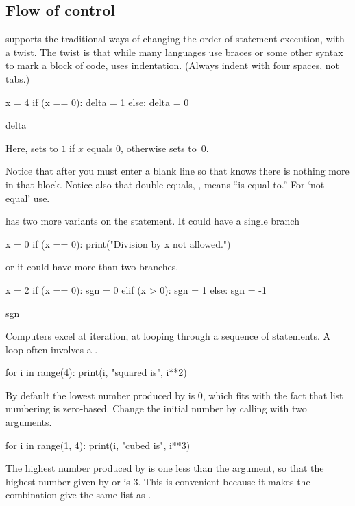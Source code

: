 \subsection{Flow of control}
\python{} supports the traditional ways of changing the order of 
statement execution, with a twist.
The twist is that while many languages use braces or some other syntax to
mark a block of code, \python{} uses indentation.
(Always indent with four spaces, not tabs.)
\begin{pythonconsole}
x = 4
if (x == 0):
    delta = 1
else:
    delta = 0

delta
\end{pythonconsole}
Here, \python{} sets  to  $1$ if $x$
equals $0$, otherwise \python{} sets  to~$0$. 

Notice that after  you must enter 
a blank line so that \python{} knows there is nothing more in that block.
Notice also that double equals, \inlinecode{==}, means ``is equal to.'' 
For `not equal' use\inlinecode{!=}. 

\python{} has two more variants on the  statement.
It could have a single branch
\begin{pythonconsole}
x = 0
if (x == 0):
    print("Division by x not allowed.")

\end{pythonconsole}
or it could have more than two branches.
\begin{pythonconsole}
x = 2
if (x == 0):
    sgn = 0
elif (x > 0):
    sgn = 1
else:
    sgn = -1

sgn
\end{pythonconsole}

Computers excel at iteration, at looping through a sequence of statements.
A  loop often involves a .
\begin{pythonconsole}
for i in range(4):
    print(i, "squared is", i**2)

\end{pythonconsole}
By default the lowest number produced by  is $0$, which
fits with the fact that list numbering is zero-based.
Change the initial number by calling  
with two arguments.
\begin{pythonconsole}
for i in range(1, 4):
    print(i, "cubed is", i**3)

\end{pythonconsole}
The highest number produced by  is one less than the 
argument, so that the highest number
given by  or  is $3$.
This is convenient because it makes the 
combination  give 
the same list as .


